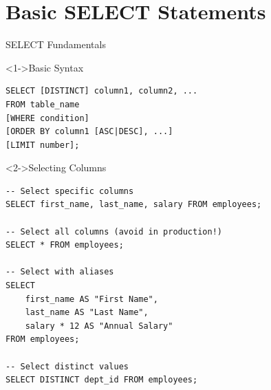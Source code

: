\documentclass[aspectratio=169,11pt]{beamer}
\begin{document}
\section{Basic SELECT Statements}

\begin{frame}[fragile]{SELECT Fundamentals}
\begin{block}<1->{Basic Syntax}
\begin{lstlisting}
SELECT [DISTINCT] column1, column2, ...
FROM table_name
[WHERE condition]
[ORDER BY column1 [ASC|DESC], ...]
[LIMIT number];
\end{lstlisting}
\end{block}

\pause
\begin{exampleblock}<2->{Selecting Columns}
\begin{lstlisting}
-- Select specific columns
SELECT first_name, last_name, salary FROM employees;

-- Select all columns (avoid in production!)
SELECT * FROM employees;

-- Select with aliases
SELECT 
    first_name AS "First Name",
    last_name AS "Last Name",
    salary * 12 AS "Annual Salary"
FROM employees;

-- Select distinct values
SELECT DISTINCT dept_id FROM employees;
\end{lstlisting}
\end{exampleblock}
\end{frame}
\end{document}
